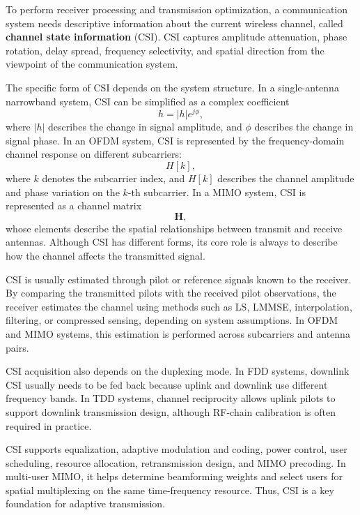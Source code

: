 
To perform receiver processing and transmission optimization, a communication
system needs descriptive information about the current wireless channel, called
\textbf{channel state information} (CSI).
CSI captures amplitude attenuation, phase rotation, delay spread, frequency
selectivity, and spatial direction from the viewpoint of the communication
system.

The specific form of CSI depends on the system structure.
In a single-antenna narrowband system, CSI can be simplified as a complex
coefficient
\begin{equation}
    h
    =
    |h|e^{j\phi},
    \label{eq:csi-siso-coefficient}
\end{equation}
where
\(|h|\) describes the change in signal amplitude,
and \(\phi\) describes the change in signal phase.
In an OFDM system, CSI is represented by the frequency-domain channel response
on different subcarriers:
\begin{equation}
    H[k],
    \label{eq:csi-ofdm-subcarrier}
\end{equation}
where
\(k\) denotes the subcarrier index,
and \(H[k]\) describes the channel amplitude and phase variation on the \(k\)-th subcarrier.
In a MIMO system, CSI is represented as a channel matrix
\begin{equation}
    \mathbf{H},
    \label{eq:csi-mimo-matrix}
\end{equation}
whose elements describe the spatial relationships between transmit and receive
antennas.
Although CSI has different forms, its core role is always to describe how the
channel affects the transmitted signal.

CSI is usually estimated through pilot or reference signals known to the
receiver.
By comparing the transmitted pilots with the received pilot observations, the
receiver estimates the channel using methods such as LS, LMMSE, interpolation,
filtering, or compressed sensing, depending on system assumptions.
In OFDM and MIMO systems, this estimation is performed across subcarriers and
antenna pairs.

CSI acquisition also depends on the duplexing mode.
In FDD systems, downlink CSI usually needs to be fed back because uplink and
downlink use different frequency bands.
In TDD systems, channel reciprocity allows uplink pilots to support downlink
transmission design, although RF-chain calibration is often required in
practice.

CSI supports equalization, adaptive modulation and coding, power control, user
scheduling, resource allocation, retransmission design, and MIMO precoding.
In multi-user MIMO, it helps determine beamforming weights and select users for
spatial multiplexing on the same time-frequency resource.
Thus, CSI is a key foundation for adaptive transmission.

